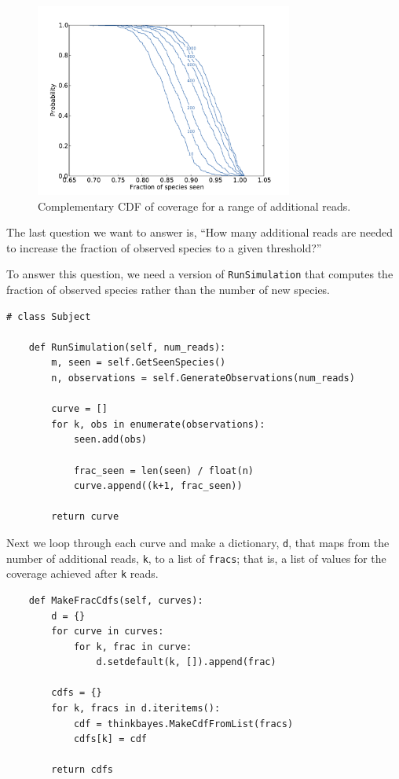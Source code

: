 \documentclass[12pt]{book}
\begin{document}
\begin{figure}
\centerline{\includegraphics[height=2.5in]{figs/species-frac-B1242.pdf}}
\caption{Complementary CDF of coverage for a range of additional reads.}
\label{species-frac}
\end{figure}

The last question we want to answer is, ``How many additional reads
are needed to increase the fraction of observed species to a given
threshold?''

To answer this question, we need a version of {\tt RunSimulation}
that computes the fraction of observed species rather than the
number of new species.

\begin{verbatim}
# class Subject

    def RunSimulation(self, num_reads):
        m, seen = self.GetSeenSpecies()
        n, observations = self.GenerateObservations(num_reads)

        curve = []
        for k, obs in enumerate(observations):
            seen.add(obs)

            frac_seen = len(seen) / float(n)
            curve.append((k+1, frac_seen))

        return curve
\end{verbatim}

Next we loop through each curve and make a dictionary, {\tt d},
that maps from the number of additional reads, {\tt k}, to
a list of {\tt fracs}; that is, a list of values for the
coverage achieved after {\tt k} reads.

\begin{verbatim}
    def MakeFracCdfs(self, curves):
        d = {}
        for curve in curves:
            for k, frac in curve:
                d.setdefault(k, []).append(frac)

        cdfs = {}
        for k, fracs in d.iteritems():
            cdf = thinkbayes.MakeCdfFromList(fracs)
            cdfs[k] = cdf

        return cdfs
\end{verbatim}
\end{document}
